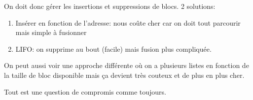 On doit donc gérer les insertions et suppressions de blocs. 2 solutions:

\begin{enumerate}
\def\labelenumi{\arabic{enumi}.}
\tightlist
\item
  Insérer en fonction de l'adresse: nous coûte cher car on doit tout
  parcourir mais simple à fusionner
\item
  LIFO: on supprime au bout (facile) mais fusion plus compliquée.
\end{enumerate}

On peut aussi voir une approche différente où on a plusieurs listes en
fonction de la taille de bloc disponible mais ça devient très couteux et
de plus en plus cher.

Tout est une question de compromis comme toujours.
